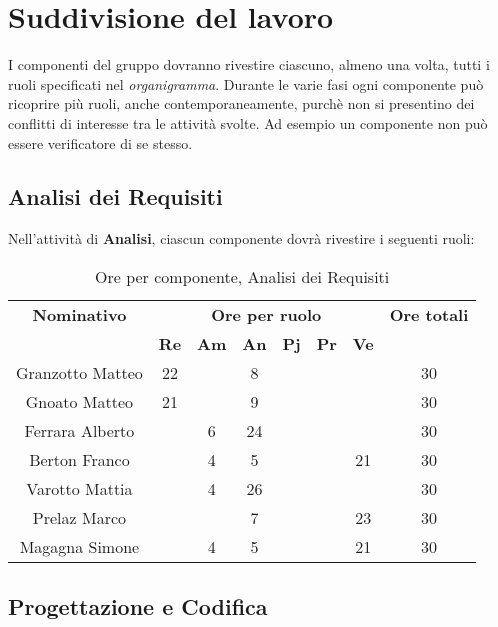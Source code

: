 \section{Suddivisione del lavoro}
I componenti del gruppo dovranno rivestire ciascuno, almeno una volta, tutti i ruoli specificati nel \textit{organigramma}.
Durante le varie fasi ogni componente può ricoprire più ruoli, anche contemporaneamente, purchè non si presentino dei conflitti di interesse tra le attività svolte. Ad esempio un componente non può essere verificatore di se stesso.
\subsection{Analisi dei Requisiti}
Nell'attività di \textbf{Analisi}, ciascun componente dovrà rivestire i seguenti ruoli:
\begin{table}[H]
	\begin{center}
		\begin{tabular}{|c|c|c|c|c|c|c|c|}
			\hline
			\textbf{Nominativo} & \multicolumn{6}{c|}{\textbf{Ore per ruolo}} & \textbf{Ore totali} \\
			& \textbf{Re} & \textbf{Am} & \textbf{An} & \textbf{Pj} & \textbf{Pr} & \textbf{Ve} & \\
			\hline
			Granzotto Matteo	&	22	&	 	&	8 	&		&	 	& 		&	30	\\
			\hline
			Gnoato Matteo		&	21	&		&	9	&		&		&		&	30	\\
			\hline
			Ferrara Alberto		&		&	6	&	24	&	 	&		&		& 	30	\\
			\hline
			Berton Franco		&		&	4	&	5	&		&		&	21	&	30	\\
			\hline
			Varotto Mattia 		&		&	4	&	26	&		&		&		& 	30	\\
			\hline
			Prelaz Marco 		& 		&		&	7	&		&		&	23	&	30	\\
			\hline
			Magagna Simone 		&		&	4	&	5	&		&		& 	21	&	30	\\
			\hline
		\end{tabular}
	\end{center}
	\caption{Ore per componente, Analisi dei Requisiti}
\end{table}
\subsection{Progettazione e Codifica}
